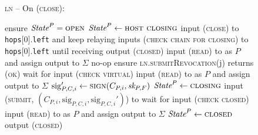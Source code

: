 \begin{figure}[H]
  \begin{processbox}{\textsc{ln} -- On (\textsc{close}):}
    \begin{algorithmic}[1]
      \State ensure $\textit{State}^P = \textsc{open}$
       
        \State $\textit{State}^P \gets \textsc{host closing}$
        \State input (\textsc{close}) to \texttt{hops}[0].\texttt{left} and
        keep relaying inputs (\textsc{check chain for closing}) to
        \texttt{hops}[0].\texttt{left} until receiving output (\textsc{closed})
      \EndIf
      \State input (\textsc{read}) to \ledger as $P$ and assign output to
      $\Sigma$
       
        \State no-op 
        \State ensure \textsc{ln.submitRevocation}(j) returns (\textsc{ok})
      \Else \: 
         
          \State wait for input (\textsc{check virtual}) 
          \State input (\textsc{read}) to \ledger as $P$ and assign output to
          $\Sigma$
        \EndWhile
        \State {}
        \State $\mathrm{sig}_{P, C, i}' \gets \textsc{sign}(C_{P, i}, \textit{sk}_{P,
        F})$
        \State $\textit{State}^P \gets \textsc{closing}$
        \State input (\textsc{submit}, $(C_{P, i}, \mathrm{sig}_{P, C, i},
        \mathrm{sig}_{P, C, i}')$) to \ledger
          \State wait for input (\textsc{check closed}) 
          \State input (\textsc{read}) to \ledger as $P$ and assign output to
          $\Sigma$
        \EndWhile
        \State {}
      \EndIf
      \State $\textit{State}^P \gets \textsc{closed}$
      \State output (\textsc{closed})
    \end{algorithmic}
  \end{processbox}
  \caption{}
  \label{code:ln:virtual}
\end{figure}
